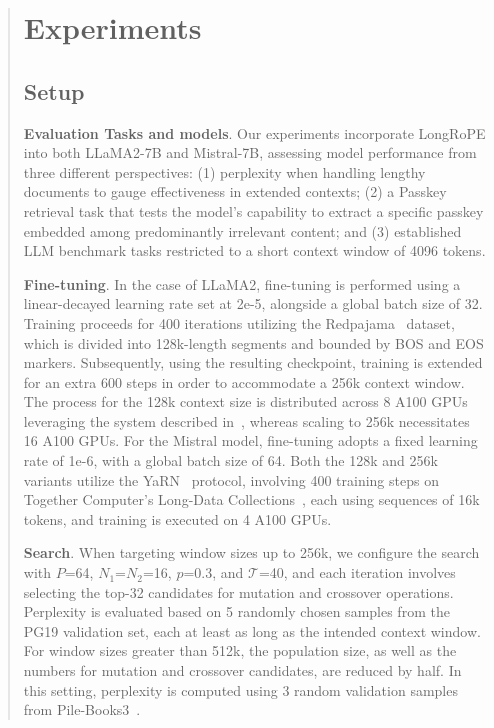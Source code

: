 \begin{abstract}
 \section{Experiments}

\label{sec:exp}
\subsection{Setup}
\textbf{Evaluation Tasks and models}. Our experiments incorporate LongRoPE into both LLaMA2-7B and Mistral-7B, assessing model performance from three different perspectives: (1) perplexity when handling lengthy documents to gauge effectiveness in extended contexts; (2) a Passkey retrieval task that tests the model's capability to extract a specific passkey embedded among predominantly irrelevant content; and (3) established LLM benchmark tasks restricted to a short context window of 4096 tokens.

\textbf{Fine-tuning}. In the case of LLaMA2, fine-tuning is performed using a linear-decayed learning rate set at 2e-5, alongside a global batch size of 32. Training proceeds for 400 iterations utilizing the Redpajama~\cite{redpajama} dataset, which is divided into 128k-length segments and bounded by BOS and EOS markers. Subsequently, using the resulting checkpoint, training is extended for an extra 600 steps in order to accommodate a 256k context window. The process for the 128k context size is distributed across 8 A100 GPUs leveraging the system described in~\cite{cube}, whereas scaling to 256k necessitates 16 A100 GPUs. For the Mistral model, fine-tuning adopts a fixed learning rate of 1e-6, with a global batch size of 64. Both the 128k and 256k variants utilize the YaRN~\cite{yarn} protocol, involving 400 training steps on Together Computer's Long-Data Collections~\cite{mistraldata}, each using sequences of 16k tokens, and training is executed on 4 A100 GPUs.

\textbf{Search}. When targeting window sizes up to 256k, we configure the search with $P$=64, $N_1$=$N_2$=16, $p$=0.3, and $\mathcal{T}$=40, and each iteration involves selecting the top-32 candidates for mutation and crossover operations. Perplexity is evaluated based on 5 randomly chosen samples from the PG19 validation set, each at least as long as the intended context window. For window sizes greater than 512k, the population size, as well as the numbers for mutation and crossover candidates, are reduced by half. In this setting, perplexity is computed using 3 random validation samples from Pile-Books3~\cite{pile}.


\end{abstract}
